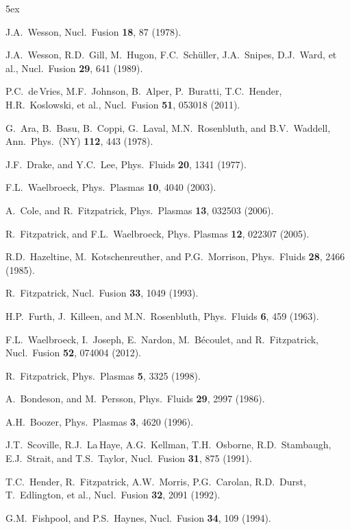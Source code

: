 \documentclass[12pt,prb,aps]{revtex4-1}
\begin{document}
\begin{thebibliography}{99}\baselineskip 5ex

 J.A.~Wesson, Nucl.\ Fusion {\bf 18}, 87 (1978).

 J.A.~Wesson, R.D.~Gill, M.~Hugon, F.C.~Sch\"{u}ller, J.A.~Snipes, D.J.~Ward, et al., Nucl.\ Fusion {\bf 29}, 641 (1989).

 P.C.~de\,Vries, M.F.~Johnson, B.~Alper, P.~Buratti, T.C.~Hender, H.R.~Koslowski, et al., Nucl.\ Fusion {\bf 51}, 053018 (2011).

 G.~Ara, B.~Basu, B.~Coppi, G.~Laval, M.N.~Rosenbluth, and B.V.~Waddell, Ann.\ Phys.\ (NY) {\bf 112}, 443 (1978).

 J.F.~Drake, and Y.C.~Lee, Phys.\ Fluids {\bf 20}, 1341 (1977).

 F.L.~Waelbroeck, Phys.\ Plasmas {\bf 10}, 4040 (2003).

 A.~Cole, and R.~Fitzpatrick, Phys.\ Plasmas {\bf 13}, 032503 (2006).

 R.~Fitzpatrick, and F.L.~Waelbroeck, Phys. Plasmas {\bf 12}, 022307 (2005).

 R.D.~Hazeltine, M.~Kotschenreuther, and P.G.~Morrison, Phys.\ Fluids {\bf 28}, 2466 (1985).

 R.~Fitzpatrick, Nucl.\ Fusion {\bf 33}, 1049 (1993).

 H.P.~Furth, J.~Killeen, and M.N.~Rosenbluth, Phys.\ Fluids {\bf 6}, 459 (1963).

 F.L.~Waelbroeck,  I.~Joseph, E.~Nardon, M.~B\'{e}coulet, and R.~Fitzpatrick, Nucl.\ Fusion {\bf 52}, 074004 (2012). 

 R.~Fitzpatrick, Phys.\ Plasmas {\bf 5}, 3325 (1998). 

 A.~Bondeson, and M.~Persson, Phys.\ Fluids {\bf 29}, 2997 (1986).

 A.H.~Boozer, Phys.\ Plasmas {\bf 3}, 4620 (1996). 

 J.T.~Scoville, R.J.~La\,Haye, A.G.~Kellman, T.H.~Osborne, R.D.~Stambaugh, E.J.~Strait, and T.S.~Taylor, Nucl.\ Fusion {\bf 31}, 875 (1991).

 T.C.~Hender, R.~Fitzpatrick, A.W.~Morris, P.G.~Carolan, R.D.~Durst, T.~Edlington, et  al., Nucl.\ Fusion {\bf 32}, 2091 (1992).

 G.M.~Fishpool, and P.S.~Haynes, Nucl.\ Fusion {\bf 34}, 109 (1994).


\end{thebibliography}
\end{document}
